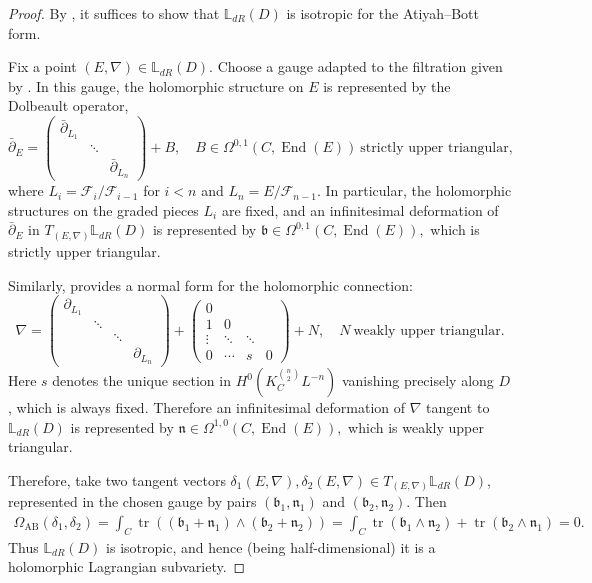 \documentclass[twoside, 11pt]{article}
\numberwithin{equation}{section}
\theoremstyle{theorem}
\numberwithin{theorem}{section}
\theoremstyle{definition}
\begin{document}
\begin{proof}
By , it suffices to show that $\mathbb{L}_{dR}(D)$ is isotropic for the Atiyah--Bott form.

Fix a point $(E,\nabla) \in \mathbb{L}_{dR}(D)$. Choose a gauge adapted to the filtration given by . In this gauge, the holomorphic structure on $E$ is represented by the Dolbeault operator,
\[
\bar\partial_E=
\begin{pmatrix}
\bar\partial_{L_1} & & \\
& \ddots & \\
& & \bar\partial_{L_n}
\end{pmatrix}
+ B,
\quad
B \in \Omega^{0,1}\!\left(C,\operatorname{End}(E)\right)\ \text{strictly upper triangular},
\]
where $L_i=\mathcal F_i/\mathcal F_{i-1}$ for $i<n$ and $ L_n=E/\mathcal F_{n-1}$. In particular, the holomorphic structures on the graded pieces $L_i$ are fixed, and an infinitesimal deformation of $\bar\partial_E$ in $T_{(E,\nabla)}\mathbb{L}_{dR}(D)$ is represented by
\(
\mathfrak b\in \Omega^{0,1}\!\left(C,\operatorname{End}(E)\right),
\)
which is strictly upper triangular.

Similarly,  provides a normal form for the holomorphic connection:
\[
\nabla=
\begin{pmatrix}
\partial_{L_1} & & & \\
& \ddots & & \\
& & \ddots & \\
& & & \partial_{ L_n}
\end{pmatrix}
+
\begin{pmatrix}
0 & & & \\
1 & 0 & & \\
\vdots & \ddots & \ddots & \\
0 & \cdots & s & 0
\end{pmatrix}
+ N,
\quad
N\ \text{weakly upper triangular}.
\]
Here $s$ denotes the unique section in $H^0\!\left(K_C^{\binom{n}{2}}L^{-n}\right)$ vanishing precisely along $D$, which is always fixed. Therefore an infinitesimal deformation of $\nabla$ tangent to $\mathbb{L}_{dR}(D)$ is represented by
\(
\mathfrak n\in \Omega^{1,0}\!\left(C,\operatorname{End}(E)\right),
\)
which is weakly upper triangular.

Therefore, take two tangent vectors $\delta_1(E,\nabla), \delta_2(E,\nabla) \in T_{(E,\nabla)}\mathbb{L}_{dR}(D)$, represented in the chosen gauge by pairs
\(
(\mathfrak b_1,\mathfrak n_1)
\)
and
\(
(\mathfrak b_2,\mathfrak n_2)
\).
Then
\begin{align*}
\Omega_{\mathrm{AB}}(\delta_1,\delta_2)
=\int_C \operatorname{tr}\!\left((\mathfrak b_1+\mathfrak n_1)\wedge(\mathfrak b_2+\mathfrak n_2)\right)
=\int_C \operatorname{tr}(\mathfrak b_1\wedge \mathfrak n_2)+\operatorname{tr}(\mathfrak b_2\wedge \mathfrak n_1)
=0.
\end{align*}
Thus $\mathbb{L}_{dR}(D)$ is isotropic, and hence (being half-dimensional) it is a holomorphic Lagrangian subvariety.
\end{proof}
\end{document}
